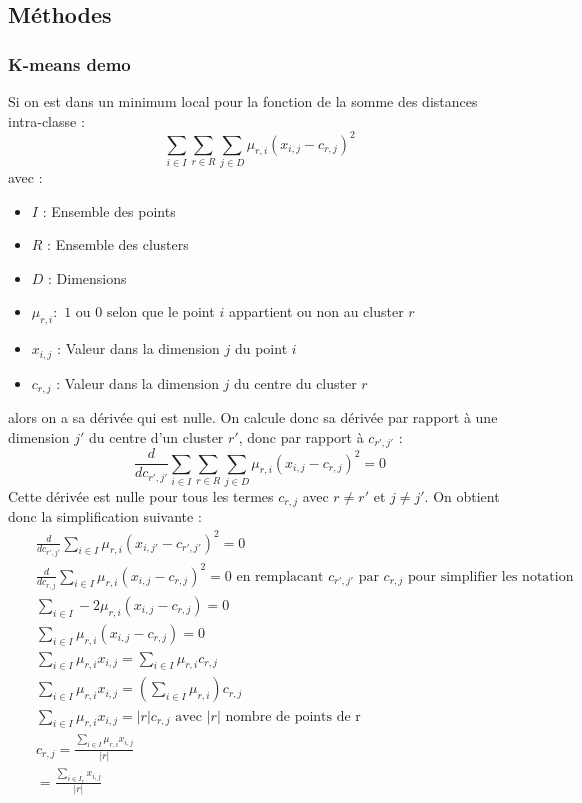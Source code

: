\subsection{Méthodes}
\subsubsection{K-means demo}
\label{kmeans} 
Si on est dans un minimum local pour la fonction de la somme des distances intra-classe :
\[ \sum_{i\in I} \sum_{r\in R} \sum_{j\in D}\mu_{r,i} (x_{i,j}-c_{r,j})^2\]
avec :
\begin{itemize}
    \item $I$ : Ensemble des points
    \item $R$ : Ensemble des clusters
    \item $D$ : Dimensions
    \item $\mu_{r,i} :$ $1$ ou $0$ selon que le point $i$ appartient ou non au cluster $r$
    \item $x_{i,j}$ : Valeur dans la dimension $j$ du point $i$
    \item $c_{r,j}$ : Valeur dans la dimension $j$ du centre du cluster $r$
\end{itemize}
alors on a sa dérivée qui est nulle. On calcule donc sa dérivée par rapport à une dimension $j'$ du centre d'un cluster $r'$, donc par rapport à $c_{r',j'}$ :
\[
    \frac{d}{dc_{r',j'}}\sum_{i\in I} \sum_{r\in R} \sum_{j\in D}\mu_{r,i} (x_{i,j}-c_{r,j})^2 = 0
\]
Cette dérivée est nulle pour tous les termes $c_{r,j}$ avec $r\neq r'$ et $j\neq j'$. On obtient donc la simplification suivante :
\begin{eqnarray*}
    && \frac{d}{dc_{r',j'}}\sum_{i\in I} \mu_{r,i} (x_{i,j'}-c_{r',j'})^2 = 0\\
    && \frac{d}{dc_{r,j}}\sum_{i\in I} \mu_{r,i} (x_{i,j}-c_{r,j})^2 = 0  \text{ en remplacant $c_{r',j'}$ par $c_{r,j}$ pour simplifier les notation}\\
    &&\sum_{i\in I}-2\mu_{r,i}(x_{i,j}-c_{r,j}) = 0\\
    &&\sum_{i\in I}\mu_{r,i}(x_{i,j}-c_{r,j}) = 0\\
    &&\sum_{i\in I}\mu_{r,i}x_{i,j} = \sum_{i\in I}\mu_{r,i}c_{r,j}\\
    &&\sum_{i\in I}\mu_{r,i}x_{i,j} = (\sum_{i\in I}\mu_{r,i})c_{r,j}\\
    &&\sum_{i\in I}\mu_{r,i}x_{i,j} = |r|c_{r,j} \text{ avec $|r|$ nombre de points de r}\\
    &&c_{r,j} = \frac{\sum_{i\in I}\mu_{r,i}x_{i,j}}{|r|}\\
    &&= \frac{\sum_{i\in I_r}x_{i,j}}{|r|}
\end{eqnarray*}
